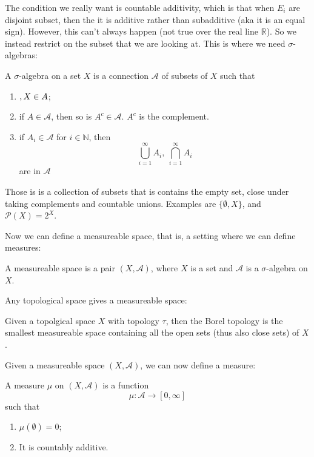 \documentclass[main.tex]{subfiles}
\begin{document}
The condition we really want is countable additivity, which is that when $E_i$ are disjoint subset, then the it is additive rather than subadditive (aka it is an equal sign). However, this can't always happen (not true over the real line $\mathbb{R}$). So we instead restrict on the subset that we are looking at. This is where we need $\sigma$-algebras:

\begin{definition}
A $\sigma$-algebra on a set $X$ is a connection $\mathcal{A}$ of subsets of $X$ such that
\begin{enumerate}
    \item $\empty, X \in A$;
    \item if $A \in \mathcal{A}$, then so is $A^c \in \mathcal{A}$. $A^c$ is the complement.
    \item if $A_i \in \mathcal{A}$ for $i \in \mathbb{N}$, then 
    $$
    \bigcup_{i=1} ^{\infty} A_i,  \ \bigcap_{i=1} ^{\infty} A_i
    $$
    are in $\mathcal{A}$
\end{enumerate}
\end{definition}
Those is is a collection of subsets that is contains the empty set, close under taking complements and countable unions.
Examples are $\{ \emptyset, X \}$, and $\mathcal{P}(X) = 2^X$.

Now we can define a measureable space, that is, a setting where we can define measures:

\begin{definition}
A measureable space is a pair $(X, \mathcal{A})$, where $X$ is a set and $\mathcal{A}$ is a $\sigma$-algebra on $X$.
\end{definition}

Any topological space gives a measureable space:

\begin{definition}
Given a topolgical space $X$ with topology $\tau$, then the Borel topology is the smallest measureable space containing all the open sets (thus also close sets) of $X$. 
\end{definition}

Given a measureable space $(X, \mathcal{A})$, we can now define a measure:

\begin{definition}
A measure $\mu$ on $(X, \mathcal{A})$ is a function 
$$
\mu: \mathcal{A} \rightarrow [0, \infty]
$$
such that 
\begin{enumerate}
    \item $\mu(\emptyset) = 0$;
    \item It is countably additive.
\end{enumerate}
\end{definition}
\end{document}
